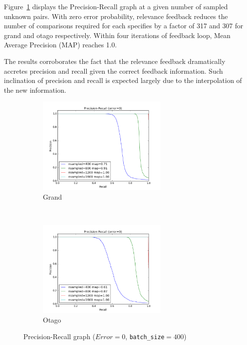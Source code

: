 Figure~\ref{fig:pr_curves} displays the Precision-Recall graph at a given number of
sampled unknown pairs. With zero error probability, relevance feedback reduces
the number of comparisons required for each specifies by a factor of 317 and
307 for grand and otago respectively. Within four iterations of feedback loop,
Mean Average Precision (MAP) reaches 1.0.

The results corroborates the fact that the relevance feedback dramatically
accretes precision and recall given the correct feedback information. Such
inclination of precision and recall is expected largely due to the
interpolation of the new information.

\begin{figure}[htbp]
  \centering
  \begin{subfigure}[t]{\textwidth}
      \centering
      \includegraphics[width=0.7\textwidth]{pr/grand}
      \caption{Grand}
  \end{subfigure}%
  ~\\
  \begin{subfigure}[t]{\textwidth}
      \centering
      \includegraphics[width=0.7\textwidth]{pr/otago}
      \caption{Otago}
  \end{subfigure}%
  \captionsetup{justification=centering}
  \caption{Precision-Recall graph ($Error=0$, \texttt{batch\_size}$=400$)}
  \label{fig:pr_curves} %
\end{figure}

